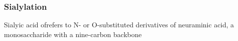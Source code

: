 \subsubsection {Sialylation}
Sialyic acid ofrefers to N- or O-substituted derivatives of neuraminic acid, a monosaccharide with a nine-carbon backbone